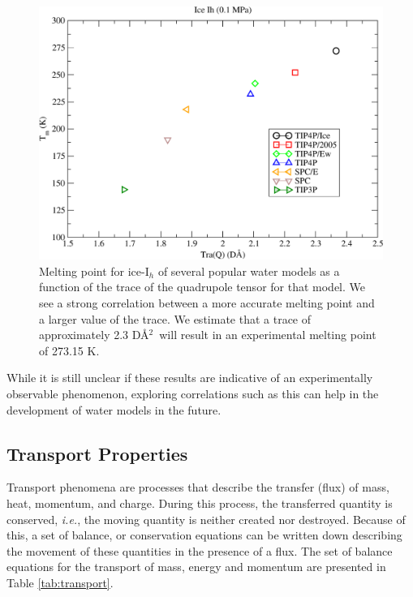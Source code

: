 \begin{figure}
\includegraphics[width = \linewidth]{Figures/Tm_Ih_TraQ_plot.pdf}
\caption{\label{fig:TraQ} Melting point for ice-I$_h$ of several popular water models as a function of the trace of the quadrupole tensor for that model. We see a strong correlation between a more accurate melting point and a larger value of the trace. We estimate that a trace of approximately 2.3 D\AA$^{2}$~will result in an experimental melting point of 273.15 K.}
\end{figure}

While it is still unclear if these results are indicative of an
experimentally observable phenomenon, exploring correlations such as
this can help in the development of water models in the future. 


\subsection{Transport Properties}
Transport phenomena are processes that describe the transfer (flux) of
mass, heat, momentum, and charge. During this
process, the transferred quantity is conserved, \textit{i.e.}, the
moving quantity is neither created nor destroyed. Because of this, a set
of balance, or conservation equations can be written down describing
the movement of these quantities in the presence of a flux. The set of
balance equations for the transport of mass, energy and momentum are
presented in Table \ref{tab:transport}. 


